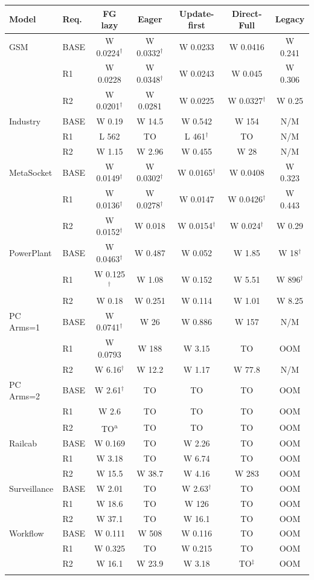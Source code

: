 \begingroup\scriptsize\setlength{\tabcolsep}{3pt}
\begin{tabular}{@{}llccccc@{}}
\toprule
Model & Req. & FG lazy & Eager & Update-first & Direct-Full & Legacy\\
\midrule
GSM & BASE & W 0.0224$^{\dagger}$ & W 0.0332$^{\dagger}$ & W 0.0233 & W 0.0416 & W 0.241\\
 & R1 & W 0.0228 & W 0.0348$^{\dagger}$ & W 0.0243 & W 0.045 & W 0.306\\
 & R2 & W 0.0201$^{\dagger}$ & W 0.0281 & W 0.0225 & W 0.0327$^{\dagger}$ & W 0.25\\
\addlinespace[2pt]
Industry & BASE & W 0.19 & W 14.5 & W 0.542 & W 154 & N/M\\
 & R1 & L 562 & TO & L 461$^{\dagger}$ & TO & N/M\\
 & R2 & W 1.15 & W 2.96 & W 0.455 & W 28 & N/M\\
\addlinespace[2pt]
MetaSocket & BASE & W 0.0149$^{\dagger}$ & W 0.0302$^{\dagger}$ & W 0.0165$^{\dagger}$ & W 0.0408 & W 0.323\\
 & R1 & W 0.0136$^{\dagger}$ & W 0.0278$^{\dagger}$ & W 0.0147 & W 0.0426$^{\dagger}$ & W 0.443\\
 & R2 & W 0.0152$^{\dagger}$ & W 0.018 & W 0.0154$^{\dagger}$ & W 0.024$^{\dagger}$ & W 0.29\\
\addlinespace[2pt]
PowerPlant & BASE & W 0.0463$^{\dagger}$ & W 0.487 & W 0.052 & W 1.85 & W 18$^{\dagger}$\\
 & R1 & W 0.125$^{\dagger}$ & W 1.08 & W 0.152 & W 5.51 & W 896$^{\dagger}$\\
 & R2 & W 0.18 & W 0.251 & W 0.114 & W 1.01 & W 8.25\\
\addlinespace[2pt]
PC Arms=1 & BASE & W 0.0741$^{\dagger}$ & W 26 & W 0.886 & W 157 & N/M\\
 & R1 & W 0.0793 & W 188 & W 3.15 & TO & OOM\\
 & R2 & W 6.16$^{\dagger}$ & W 12.2 & W 1.17 & W 77.8 & N/M\\
\addlinespace[2pt]
PC Arms=2 & BASE & W 2.61$^{\dagger}$ & TO & TO & TO & OOM\\
 & R1 & W 2.6 & TO & TO & TO & OOM\\
 & R2 & TO\textsuperscript{a} & TO & TO & TO & OOM\\
\addlinespace[2pt]
Railcab & BASE & W 0.169 & TO & W 2.26 & TO & OOM\\
 & R1 & W 3.18 & TO & W 6.74 & TO & OOM\\
 & R2 & W 15.5 & W 38.7 & W 4.16 & W 283 & OOM\\
\addlinespace[2pt]
Surveillance & BASE & W 2.01 & TO & W 2.63$^{\dagger}$ & TO & OOM\\
 & R1 & W 18.6 & TO & W 126 & TO & OOM\\
 & R2 & W 37.1 & TO & W 16.1 & TO & OOM\\
\addlinespace[2pt]
Workflow & BASE & W 0.111 & W 508 & W 0.116 & TO & OOM\\
 & R1 & W 0.325 & TO & W 0.215 & TO & OOM\\
 & R2 & W 16.1 & W 23.9 & W 3.18 & TO$^{\ddagger}$ & OOM\\
\addlinespace[2pt]
\bottomrule
\end{tabular}\endgroup
